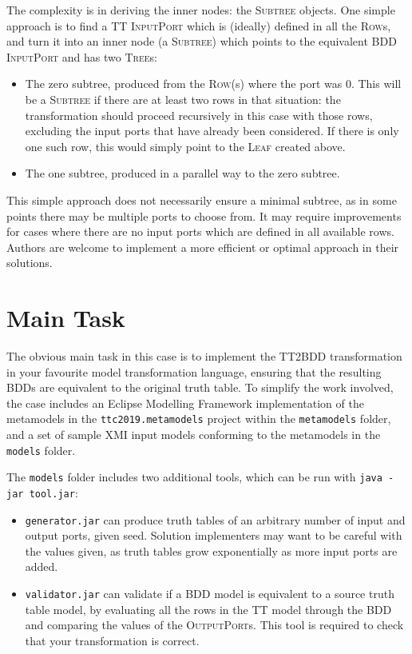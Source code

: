 \documentclass[a4paper]{scrartcl}
\newcommand*{\class}[1]{\textsc{#1}}
\newcommand*{\file}[1]{\texttt{#1}}
\begin{document}
The complexity is in deriving the inner nodes: the \class{Subtree} objects. One
simple approach is to find a TT \class{Input\-Port} which is (ideally) defined
in all the \class{Row}s, and turn it into an inner node (a \class{Subtree})
which points to the equivalent BDD \class{Input\-Port} and has two
\class{Tree}s:
\begin{itemize}
\item The zero subtree, produced from the \class{Row}(s) where the port was 0.
  This will be a \class{Subtree} if there are at least two rows in that
  situation: the transformation should proceed recursively in this case with
  those rows, excluding the input ports that have already been considered. If
  there is only one such row, this would simply point to the \class{Leaf}
  created above.

\item The one subtree, produced in a parallel way to the zero subtree.
\end{itemize}

This simple approach does not necessarily ensure a minimal subtree, as in some
points there may be multiple ports to choose from. It may require improvements
for cases where there are no input ports which are defined in all available
rows. Authors are welcome to implement a more efficient or optimal approach in
their solutions.

\section{Main Task}
\label{sec:task-suggestions}

The obvious main task in this case is to implement the TT2BDD transformation in
your favourite model transformation language, ensuring that the resulting BDDs
are equivalent to the original truth table. To simplify the work involved, the
case includes an Eclipse Modelling Framework implementation of the metamodels in
the \file{ttc2019.metamodels} project within the \file{metamodels} folder, and a
set of sample XMI input models conforming to the metamodels in the \file{models}
folder.

The \file{models} folder includes two additional tools, which can be run with
\file{java -jar tool.jar}:
\begin{itemize}
\item \file{generator.jar} can produce truth tables of an arbitrary number of
  input and output ports, given seed. Solution implementers may want to be
  careful with the values given, as truth tables grow exponentially as more
  input ports are added.

\item \file{validator.jar} can validate if a BDD model is equivalent to a source
  truth table model, by evaluating all the rows in the TT model through the BDD
  and comparing the values of the \class{Output\-Port}s. This tool is required
  to check that your transformation is correct.
\end{itemize}
\end{document}
